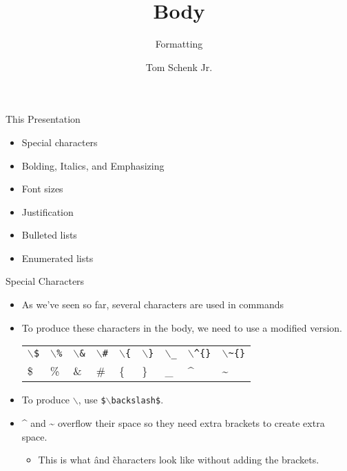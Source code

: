 \documentclass[pdf]{prosper}
\title{Body}
\subtitle{Formatting}
\author{Tom Schenk Jr.}		%
\begin{document}
\maketitle
\begin{slide}{This Presentation}
	\begin{itemize}
		\item Special characters
		\item Bolding, Italics, and Emphasizing
		\item Font sizes
		\item Justification
		\item Bulleted lists
		\item Enumerated lists
	\end{itemize}
\end{slide}
\begin{slide}{Special Characters}
	\begin{itemize}
		\item As we've seen so far, several characters are used in commands
		\item To produce these characters in the body, we need to use a modified version. \\
			\begin{tabular}{l l l l l l l l l}
				\texttt{$\backslash$\$} & \texttt{$\backslash$\%} & \texttt{$\backslash$\&} & \texttt{$\backslash$\#} & \texttt{$\backslash$\{} & \texttt{$\backslash$\}} & \texttt{$\backslash$\_} & \texttt{$\backslash$\^{}\{\}} & \texttt{$\backslash$\~{}\{\}} \\
				\$ & \% & \& & \# & \{ & \} & \_ & \^{} & \~{} \\
			\end{tabular}
		\item To produce $\backslash$, use \texttt{\$$\backslash$backslash\$}.
		\item \^{} and \~{} overflow their space so they need extra brackets to create extra space.
			\begin{itemize}
				\item This is what \^ and \~ characters look like without adding the brackets.
			\end{itemize}
	\end{itemize}
\end{slide}
\end{document}
